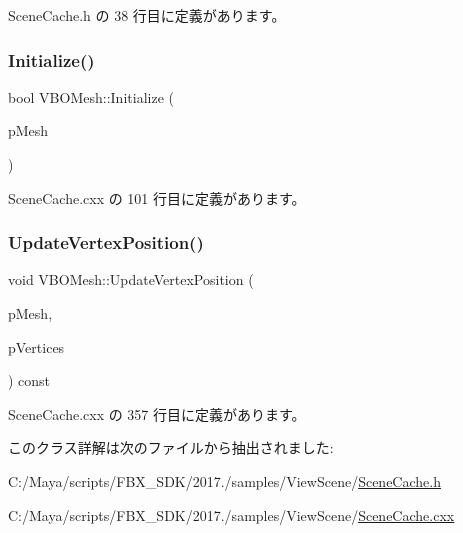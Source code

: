  Scene\+Cache.\+h の 38 行目に定義があります。

\mbox{\label{class_v_b_o_mesh_a352852754a2a04d4328ec1b874c9eec4}} 
\subsubsection{\texorpdfstring{Initialize()}{Initialize()}}
{\footnotesize\ttfamily bool V\+B\+O\+Mesh\+::\+Initialize (\begin{DoxyParamCaption}\item[{const \hyperlink{class_fbx_mesh}{Fbx\+Mesh} $\ast$}]{p\+Mesh }\end{DoxyParamCaption})}



 Scene\+Cache.\+cxx の 101 行目に定義があります。

\mbox{\label{class_v_b_o_mesh_a2e8f99b6619cf91b1f8fbf6f5224fcd4}} 
\subsubsection{\texorpdfstring{Update\+Vertex\+Position()}{UpdateVertexPosition()}}
{\footnotesize\ttfamily void V\+B\+O\+Mesh\+::\+Update\+Vertex\+Position (\begin{DoxyParamCaption}\item[{const \hyperlink{class_fbx_mesh}{Fbx\+Mesh} $\ast$}]{p\+Mesh,  }\item[{const \hyperlink{class_fbx_vector4}{Fbx\+Vector4} $\ast$}]{p\+Vertices }\end{DoxyParamCaption}) const}



 Scene\+Cache.\+cxx の 357 行目に定義があります。



このクラス詳解は次のファイルから抽出されました\+:\begin{DoxyCompactItemize}
\item 
C\+:/\+Maya/scripts/\+F\+B\+X\+\_\+\+S\+D\+K/2017./samples/\+View\+Scene/\hyperlink{_scene_cache_8h}{Scene\+Cache.\+h}\item 
C\+:/\+Maya/scripts/\+F\+B\+X\+\_\+\+S\+D\+K/2017./samples/\+View\+Scene/\hyperlink{_scene_cache_8cxx}{Scene\+Cache.\+cxx}\end{DoxyCompactItemize}

